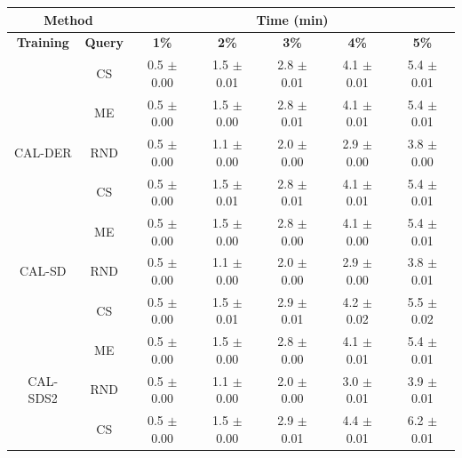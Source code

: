 \begin{table}[htbp]
\centering

\begin{tabular*}{\linewidth}{c|c|@{\extracolsep{\fill}}ccccc}
\toprule
\multicolumn{2}{c|}{\textbf{Method}} & \multicolumn{5}{c}{\textbf{Time (min)}} \\
\midrule
\textbf{Training} & \textbf{Query} & \textbf{1\%} & \textbf{2\%} & \textbf{3\%} & \textbf{4\%} & \textbf{5\%}\\
\midrule
 & CS & 0.5 $\pm$ {\small 0.00} & 1.5 $\pm$ {\small 0.01} & 2.8 $\pm$ {\small 0.01} & 4.1 $\pm$ {\small 0.01} & 5.4 $\pm$ {\small 0.01}\\

 & ME & 0.5 $\pm$ {\small 0.00} & 1.5 $\pm$ {\small 0.00} & 2.8 $\pm$ {\small 0.01} & 4.1 $\pm$ {\small 0.01} & 5.4 $\pm$ {\small 0.01}\\

\multirow{-3}{*}{\raggedright\arraybackslash CAL-DER} & RND & 0.5 $\pm$ {\small 0.00} & 1.1 $\pm$ {\small 0.00} & 2.0 $\pm$ {\small 0.00} & 2.9 $\pm$ {\small 0.00} & 3.8 $\pm$ {\small 0.00}\\
\midrule
 & CS & 0.5 $\pm$ {\small 0.00} & 1.5 $\pm$ {\small 0.01} & 2.8 $\pm$ {\small 0.01} & 4.1 $\pm$ {\small 0.01} & 5.4 $\pm$ {\small 0.01}\\

 & ME & 0.5 $\pm$ {\small 0.00} & 1.5 $\pm$ {\small 0.00} & 2.8 $\pm$ {\small 0.00} & 4.1 $\pm$ {\small 0.00} & 5.4 $\pm$ {\small 0.01}\\

\multirow{-3}{*}{\raggedright\arraybackslash CAL-SD} & RND & 0.5 $\pm$ {\small 0.00} & 1.1 $\pm$ {\small 0.00} & 2.0 $\pm$ {\small 0.00} & 2.9 $\pm$ {\small 0.00} & 3.8 $\pm$ {\small 0.01}\\
\midrule
 & CS & 0.5 $\pm$ {\small 0.00} & 1.5 $\pm$ {\small 0.01} & 2.9 $\pm$ {\small 0.01} & 4.2 $\pm$ {\small 0.02} & 5.5 $\pm$ {\small 0.02}\\

 & ME & 0.5 $\pm$ {\small 0.00} & 1.5 $\pm$ {\small 0.00} & 2.8 $\pm$ {\small 0.00} & 4.1 $\pm$ {\small 0.01} & 5.4 $\pm$ {\small 0.01}\\

\multirow{-3}{*}{\raggedright\arraybackslash CAL-SDS2} & RND & 0.5 $\pm$ {\small 0.00} & 1.1 $\pm$ {\small 0.00} & 2.0 $\pm$ {\small 0.00} & 3.0 $\pm$ {\small 0.01} & 3.9 $\pm$ {\small 0.01}\\
\midrule
 & CS & 0.5 $\pm$ {\small 0.00} & 1.5 $\pm$ {\small 0.00} & 2.9 $\pm$ {\small 0.01} & 4.4 $\pm$ {\small 0.01} & 6.2 $\pm$ {\small 0.01}\\


\end{tabular*}
\end{table}
